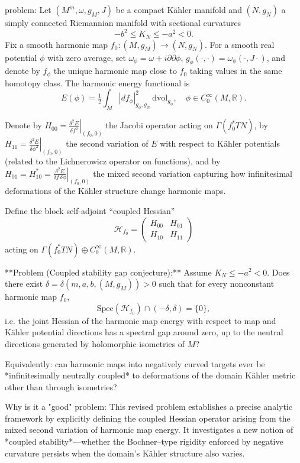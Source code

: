 problem:  
Let \( (M^{m},\omega,g_M,J) \) be a compact Kähler manifold and \( (N,g_N) \) a simply connected Riemannian manifold with sectional curvatures
\[
-b^2 \le K_N \le -a^2 < 0.
\]
Fix a smooth harmonic map \(f_0:(M,g_M)\to(N,g_N)\).  
For a smooth real potential \(\phi\) with zero average, set \(\omega_{\phi}=\omega+i\partial\bar{\partial}\phi\), \(g_{\phi}(\cdot,\cdot)=\omega_{\phi}(\cdot,J\cdot)\), and denote by \( f_{\phi} \) the unique harmonic map close to \(f_0\) taking values in the same homotopy class.  The harmonic energy functional is  
\[
E(\phi) = \tfrac{1}{2}\int_M |df_{\phi}|^2_{g_{\phi},g_N}\,\mathrm{dvol}_{g_{\phi}}, \quad \phi\in C^{\infty}_0(M,\mathbb{R}).
\]

Denote by \(H_{00} = \left.\frac{\delta^2 E}{\delta f^2}\right|_{(f_0,0)}\) the Jacobi operator acting on \(\Gamma(f_0^*TN)\), by \(H_{11} = \left.\frac{\delta^2 E}{\delta \phi^2}\right|_{(f_0,0)}\) the second variation of \(E\) with respect to Kähler potentials (related to the Lichnerowicz operator on functions), and by \(H_{01}=H_{10}^*=\left.\frac{\delta^2 E}{\delta f\,\delta\phi}\right|_{(f_0,0)}\) the mixed second variation capturing how infinitesimal deformations of the Kähler structure change harmonic maps.

Define the block self-adjoint “coupled Hessian”
\[
\mathcal{H}_{f_0} =
\begin{pmatrix}
H_{00} & H_{01}\\
H_{10} & H_{11}
\end{pmatrix}
\]
acting on \( \Gamma(f_0^*TN)\oplus C_0^{\infty}(M,\mathbb{R})\).

**Problem (Coupled stability gap conjecture):**  
Assume \(K_N\le -a^2<0\).  Does there exist \(\delta=\delta(m,a,b,(M,g_M))>0\) such that for every nonconstant harmonic map \(f_0\),
\[
\mathrm{Spec}(\mathcal{H}_{f_0})\cap(-\delta,\delta)=\{0\},
\]
i.e. the joint Hessian of the harmonic map energy with respect to map and Kähler potential directions has a spectral gap around zero, up to the neutral directions generated by holomorphic isometries of \(M\)?  

Equivalently: can harmonic maps into negatively curved targets ever be *infinitesimally neutrally coupled* to deformations of the domain Kähler metric other than through isometries?

Why is it a "good" problem:  
This revised problem establishes a precise analytic framework by explicitly defining the coupled Hessian operator arising from the mixed second variation of harmonic map energy. It investigates a new notion of *coupled stability*—whether the Bochner–type rigidity enforced by negative curvature persists when the domain’s Kähler structure also varies.  

